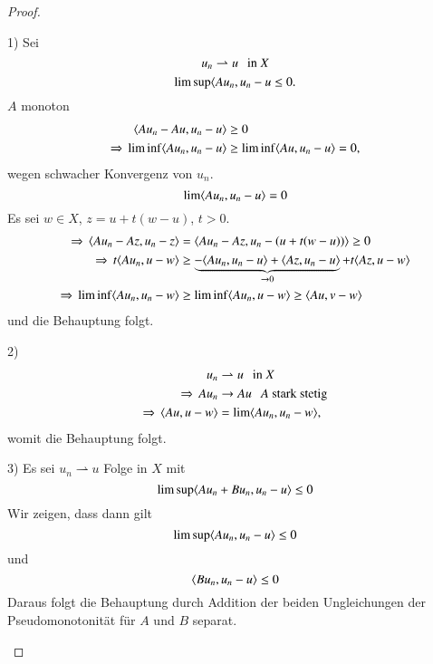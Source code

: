 \begin{proof}
    \begin{description}
        \item{1)}
        Sei
        \[
            u_n\rightharpoonup u \hspace{.25cm}\text{in } X
        \]
        \[
            \limsup \langle Au_n , u_n - u \leq 0.
        \]
        $A$ monoton
        \begin{align*}
            \langle Au_n- Au, u_n -u \rangle & \geq 0 \\
            \Rightarrow \, \liminf\langle Au_n , u_n - u \rangle &\geq \liminf \langle Au, u_n - u \rangle = 0,
        \end{align*}
        wegen schwacher Konvergenz von $u_n$.
        \[
            \lim \langle Au_n , u_n - u\rangle =0
        \]
        Es sei $w\in X$, $z=u+t(w-u)$, $t>0$.
        \begin{align*}
            \Rightarrow \, \langle Au_n - Az, u_n - z \rangle &= \langle Au_n - Az , u_n -(u+t(w-u)) \rangle \geq 0\\
            \Rightarrow \, t\langle Au_n , u-w \rangle &\geq \underbrace{-\langle Au_n , u_n - u\rangle + \langle Az, u_n - u
                \rangle}_{\rightarrow 0} + t\langle Az, u-w\rangle\\
            \Rightarrow \, \liminf \langle Au_n , u_n - w \rangle &\geq \liminf \langle Au_n, u-w \rangle \geq \langle Au, v-w
            \rangle
        \end{align*}
        und die Behauptung folgt.
        \item{2)}
        \begin{align*}
            u_n&\rightharpoonup u \hspace{.25cm} \text{in } X\\
            \Rightarrow \, Au_n&\rightarrow Au \hspace{.25cm} \text{$A$ stark stetig}\\
            \Rightarrow \, \langle Au,u-w\rangle &= \lim \langle Au_n ,u_n - w \rangle,
        \end{align*}
        womit die Behauptung folgt.
        \item{3)}
        Es sei $u_n \rightharpoonup u$ Folge in $X$ mit
        \[
            \limsup \langle Au_n + Bu_n, u_n -u\rangle \leq 0
        \]
        Wir zeigen, dass dann gilt
        \[
            \limsup\langle Au_n , u_n -u\rangle \leq 0
        \]
        und
        \[
            \langle Bu_n, u_n - u \rangle \leq 0
        \]
        Daraus folgt die Behauptung durch Addition der beiden Ungleichungen der Pseudomonotonität für
        $A$ und $B$ separat.
        

\end{description}
\end{proof}
